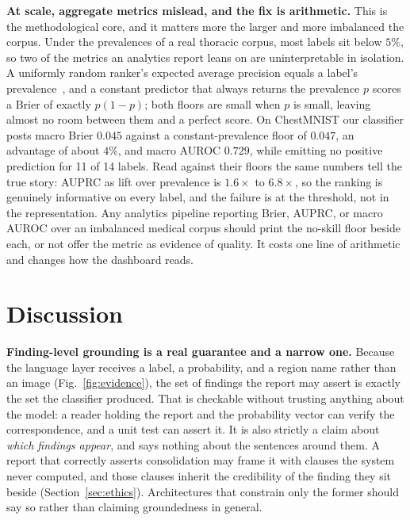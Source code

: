 \documentclass[conference]{IEEEtran}
\newcommand{\rih}[1]{\textbf{#1}\enspace\ignorespaces}
\begin{document}
\rih{At scale, aggregate metrics mislead, and the fix is arithmetic.} This is the
methodological core, and it matters more the larger and more imbalanced the corpus.
Under the prevalences of a real thoracic corpus, most labels sit below $5\%$, so two
of the metrics an analytics report leans on are uninterpretable in isolation. A
uniformly random ranker's expected average precision equals a label's
prevalence~\cite{davis2006pr,saito2015prc}, and a constant predictor that always
returns the prevalence $p$ scores a Brier of exactly $p(1-p)$; both floors are small
when $p$ is small, leaving almost no room between them and a perfect score. On
ChestMNIST our classifier posts macro Brier $0.045$ against a constant-prevalence
floor of $0.047$, an advantage of about $4\%$, and macro AUROC $0.729$, while
emitting no positive prediction for 11 of 14 labels. Read against their floors the
same numbers tell the true story: AUPRC as lift over prevalence is $1.6\times$ to
$6.8\times$, so the ranking is genuinely informative on every label, and the failure
is at the threshold, not in the representation. Any analytics pipeline reporting
Brier, AUPRC, or macro AUROC over an imbalanced medical corpus should print the
no-skill floor beside each, or not offer the metric as evidence of quality. It costs
one line of arithmetic and changes how the dashboard reads.

\section{Discussion}
\label{sec:discussion}

\rih{Finding-level grounding is a real guarantee and a narrow one.} Because the
language layer receives a label, a probability, and a region name rather than an
image (Fig.~\ref{fig:evidence}), the set of findings the report may assert is
exactly the set the classifier produced. That is checkable without trusting anything
about the model: a reader holding the report and the probability vector can verify
the correspondence, and a unit test can assert it. It is also strictly a claim about
\emph{which findings appear}, and says nothing about the sentences around them. A
report that correctly asserts consolidation may frame it with clauses the system
never computed, and those clauses inherit the credibility of the finding they sit
beside (Section~\ref{sec:ethics}). Architectures that constrain only the former
should say so rather than claiming groundedness in general.
\end{document}
